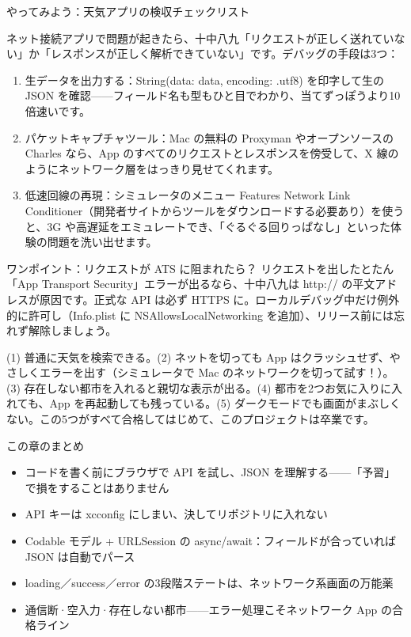 \begin{tcbpractice}{やってみよう：天気アプリの検収チェックリスト}

ネット接続アプリで問題が起きたら、十中八九「リクエストが正しく送れていない」か「レスポンスが正しく解析できていない」です。デバッグの手段は3つ：

\begin{enumerate}
  \item 生データを出力する：String(data: data, encoding: .utf8) を印字して生の JSON を確認——フィールド名も型もひと目でわかり、当てずっぽうより10倍速いです。
  \item パケットキャプチャツール：Mac の無料の Proxyman やオープンソースの Charles なら、App のすべてのリクエストとレスポンスを傍受して、X 線のようにネットワーク層をはっきり見せてくれます。
  \item 低速回線の再現：シミュレータのメニュー Features Network Link Conditioner（開発者サイトからツールをダウンロードする必要あり）を使うと、3G や高遅延をエミュレートでき、「ぐるぐる回りっぱなし」といった体験の問題を洗い出せます。
\end{enumerate}

\begin{tcbinfo}{ワンポイント：リクエストが ATS に阻まれたら？}
リクエストを出したとたん「App Transport Security」エラーが出るなら、十中八九は http:// の平文アドレスが原因です。正式な API は必ず HTTPS に。ローカルデバッグ中だけ例外的に許可し（Info.plist に NSAllowsLocalNetworking を追加）、リリース前には忘れず解除しましょう。

\end{tcbinfo}

(1) 普通に天気を検索できる。(2) ネットを切っても App はクラッシュせず、やさしくエラーを出す（シミュレータで Mac のネットワークを切って試す！）。(3) 存在しない都市を入れると親切な表示が出る。(4) 都市を2つお気に入りに入れても、App を再起動しても残っている。(5) ダークモードでも画面がまぶしくない。この5つがすべて合格してはじめて、このプロジェクトは卒業です。

\end{tcbpractice}

\begin{tcbsummary}{この章のまとめ}
\begin{itemize}
  \item コードを書く前にブラウザで API を試し、JSON を理解する——「予習」で損をすることはありません
  \item API キーは xcconfig にしまい、決してリポジトリに入れない
  \item Codable モデル + URLSession の async/await：フィールドが合っていれば JSON は自動でパース
  \item loading／success／error の3段階ステートは、ネットワーク系画面の万能薬
  \item 通信断·空入力·存在しない都市——エラー処理こそネットワーク App の合格ライン
\end{itemize}

\end{tcbsummary}
